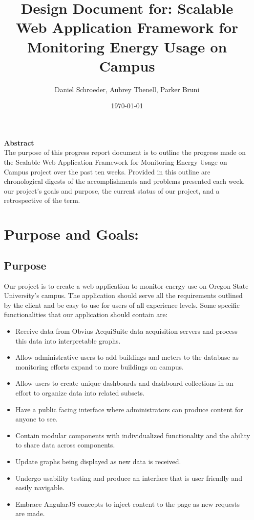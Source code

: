 \documentclass[journal,10pt,onecolumn,compsoc]{IEEEtran} \usepackage[margin=1.0in]{geometry} \usepackage{pdfpages}
\title{Design Document for: \linebreak Scalable Web Application Framework for Monitoring Energy Usage on Campus}
\author{Daniel Schroeder, Aubrey Thenell, Parker Bruni}
\date{\today}
\begin{document}
     \maketitle
     \vspace{2cm}
     \begin{center}
     \noindent \textbf{Abstract} \\
                 \indent The purpose of this progress report document is to outline the progress made on the Scalable Web Application Framework for Monitoring Energy Usage on Campus project over the past ten weeks. Provided in this outline are chronological digests of the accomplishments and problems presented each week, our project's goals and purpose, the current status of our project, and a retrospective of the term. 
     \end{center}         
     
     \newpage
    \tableofcontents
    \newpage
    \section{Purpose and Goals:}
    \subsection{Purpose} 
    Our project is to create a web application to monitor energy use on Oregon State University’s campus. The application should serve all the requirements outlined by the client and be easy to use for users of all experience levels.
    \noindent Some specific functionalities that our application should contain are:
    \begin{itemize}
        \item Receive data from Obvius AcquiSuite data acquisition servers and process this data into interpretable graphs.
        \item Allow administrative users to add buildings and meters to the database as monitoring efforts expand to more buildings on campus.
        \item Allow users to create unique dashboards and dashboard collections in an effort to organize data into related subsets.
        \item Have a public facing interface where administrators can produce content for anyone to see.
        \item Contain modular components with individualized functionality and the ability to share data across components.
        \item Update graphs being displayed as new data is received.
        \item Undergo usability testing and produce an interface that is user friendly and easily navigable.
        \item Embrace AngularJS concepts to inject content to the page as new requests are made.
    \end{itemize}
    
\end{document}
